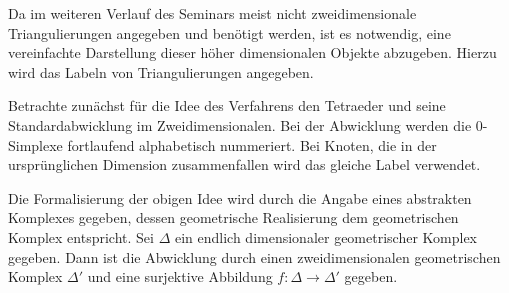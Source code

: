 \begin{Bem}
  Da im weiteren Verlauf des Seminars meist nicht zweidimensionale
  Triangulierungen angegeben und benötigt werden, ist es notwendig,
  eine vereinfachte Darstellung dieser höher dimensionalen Objekte
  abzugeben. Hierzu wird das Labeln von Triangulierungen angegeben.

  Betrachte zunächst für die Idee des Verfahrens den Tetraeder und
  seine Standardabwicklung im Zweidimensionalen.
  Bei der Abwicklung werden die $0$-Simplexe fortlaufend alphabetisch
  nummeriert. Bei Knoten, die in der ursprünglichen Dimension
  zusammenfallen wird das gleiche Label verwendet.

  Die Formalisierung der obigen Idee wird durch die Angabe eines
  abstrakten Komplexes gegeben, dessen geometrische Realisierung dem
  geometrischen Komplex entspricht. Sei $\Delta$ ein endlich
  dimensionaler geometrischer Komplex gegeben. Dann ist die Abwicklung
  durch einen zweidimensionalen geometrischen Komplex $\Delta'$ und
  eine surjektive Abbildung $f: \Delta \rightarrow \Delta'$ gegeben.


\end{Bem}



